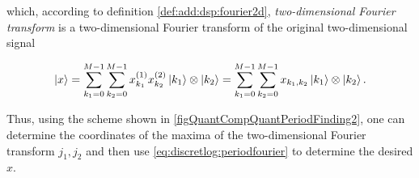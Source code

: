which, according to definition \ref{def:add:dsp:fourier2d},
\textit{two-dimensional Fourier transform}
is a two-dimensional Fourier transform of the original two-dimensional 
signal

\[
\ket{x} = 
\sum_{k_1 = 0}^{M-1}\sum_{k_2 = 0}^{M-1}
x_{k_1}^{(1)}x_{k_2}^{(2)} \ket{k_1} \otimes \ket{k_2} =
\sum_{k_1 = 0}^{M-1}\sum_{k_2 = 0}^{M-1}
x_{k_1,k_2} \ket{k_1} \otimes \ket{k_2}.  
\]



Thus, using the scheme shown in \autoref{figQuantCompQuantPeriodFinding2}, one can determine the coordinates of the maxima of the two-dimensional Fourier transform $j_1, j_2$ and then use \eqref{eq:discretlog:periodfourier} to determine the desired $x$.
